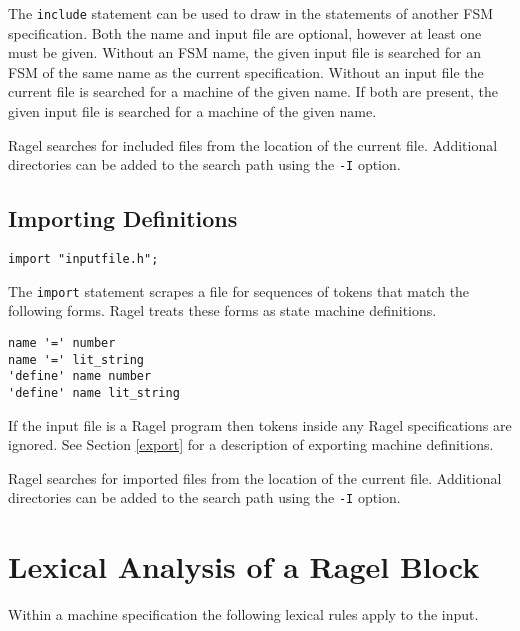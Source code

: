 \documentclass[letterpaper,11pt,oneside]{book}
\newcommand{\verbspace}{\vspace{10pt}}
\begin{document}
The \verb|include| statement can be used to draw in the statements of another FSM
specification. Both the name and input file are optional, however at least one
must be given. Without an FSM name, the given input file is searched for an FSM
of the same name as the current specification. Without an input file the
current file is searched for a machine of the given name. If both are present,
the given input file is searched for a machine of the given name.

Ragel searches for included files from the location of the current file.
Additional directories can be added to the search path using the \verb|-I|
option.

\subsection{Importing Definitions}
\label{import}

\begin{verbatim}
import "inputfile.h";
\end{verbatim}
\verbspace

The \verb|import| statement scrapes a file for sequences of tokens that match
the following forms. Ragel treats these forms as state machine definitions.

\noindent\hspace*{24pt}\verb|name '=' number|\\
\noindent\hspace*{24pt}\verb|name '=' lit_string|\\
\noindent\hspace*{24pt}\verb|'define' name number|\\
\noindent\hspace*{24pt}\verb|'define' name lit_string|
\vspace{12pt}

If the input file is a Ragel program then tokens inside any Ragel
specifications are ignored. See Section \ref{export} for a description of
exporting machine definitions.

Ragel searches for imported files from the location of the current file.
Additional directories can be added to the search path using the \verb|-I|
option.

\section{Lexical Analysis of a Ragel Block}
\label{lexing}

Within a machine specification the following lexical rules apply to the input.
\end{document}
